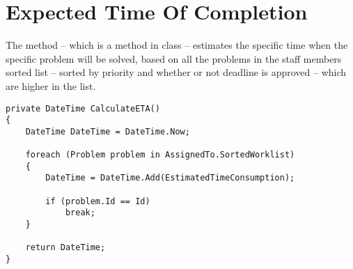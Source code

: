 \section{Expected Time Of Completion}
\label{sec:expected_time_of_completion}

The  method -- which is a method in  class -- estimates the specific time when the specific problem will be solved, based on all the problems in the staff members sorted list -- sorted by priority and whether or not deadline is approved -- which are higher in the list.

\begin{lstlisting}[style=sourceCode, caption=\myCaption{The ManageTagTimes method}, label=lst:calculateeta]
private DateTime CalculateETA()
{
    DateTime DateTime = DateTime.Now;

    foreach (Problem problem in AssignedTo.SortedWorklist)
    {
        DateTime = DateTime.Add(EstimatedTimeConsumption);

        if (problem.Id == Id)
            break;
    }

    return DateTime;
}
\end{lstlisting}